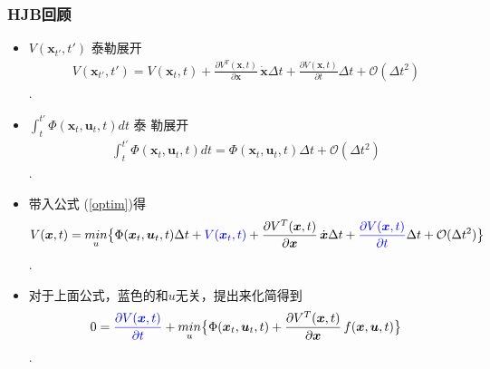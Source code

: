 \documentclass[UTF8, aspectratio=169, 9pt]{ctexbeamer}
\begin{document}
\begin{frame}
  \frametitle{HJB回顾}
  \begin{itemize}
  \item $V( \boldsymbol{x}_{t'}, t' )$ 泰勒展开
    \begin{align}
      V( \boldsymbol{x}_{t'}, t' ) = V( \boldsymbol{x}_{t}, t ) + \frac{
      \partial V^T ( \boldsymbol{x}, t  ) } { \partial
      \boldsymbol{x}  } \, \dot { \boldsymbol{x} }  \Delta t + \frac{ \partial V
      ( \boldsymbol{x}, t )}{ \partial t } \Delta t + \mathcal{O} ( \Delta t^2 )
    \end{align}.
  \item $      \int_t^{t'}\Phi( \boldsymbol{x}_t,  \boldsymbol{u}_t, t ) dt$ 泰
    勒展开
    \begin{align}
            \int_t^{t'}\Phi( \boldsymbol{x}_t,  \boldsymbol{u}_t, t ) dt = \Phi(
      \boldsymbol{x}_t,  \boldsymbol{u}_t, t ) \Delta t + \mathcal{O} (\Delta
      t^2 )
    \end{align}.
  \item 带入公式 (\ref{optim})得
    \begin{align}
      V( \boldsymbol{x}, t ) = \underset{u}{min} \big \{
      \Phi(
      \boldsymbol{x}_t,  \boldsymbol{u}_t, t ) \Delta t + \textcolor{blue} { V(
      \boldsymbol{x}_{t}, t ) } + \frac{
      \partial V^T ( \boldsymbol{x}, t  ) } { \partial
      \boldsymbol{x}  } \, \dot { \boldsymbol{x} }  \Delta t + \textcolor{blue} { \frac{ \partial V
      ( \boldsymbol{x}, t )}{ \partial t } } \Delta t
      + \mathcal{O} (\Delta
      t^2 )
      \big \}
    \end{align}.
  \item 对于上面公式，蓝色的和$u$无关，提出来化简得到
    \begin{align}
      \label{hjb}
      0 = \textcolor{blue} { \frac{ \partial V
      ( \boldsymbol{x}, t )}{ \partial t } }  +
      \underset{u}{min} \big \{
      \Phi(
      \boldsymbol{x}_t,  \boldsymbol{u}_t, t )  + \frac{
      \partial V^T ( \boldsymbol{x}, t  ) } { \partial
      \boldsymbol{x}  } \, f(\boldsymbol{x}, \boldsymbol{u}, t)
      \big \}
    \end{align}.
  \end{itemize}
\end{frame}
\end{document}
